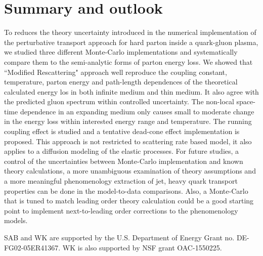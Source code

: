 \documentclass[aps, prc, reprint, amsmath, groupedaddress, nofootinbib]{revtex4-1}
\begin{document}
\section{Summary and outlook}\label{section:summary}
To reduces the theory uncertainty introduced in the numerical implementation of the perturbative transport approach for hard parton inside a quark-gluon plasma, we studied three different Monte-Carlo implementations and systematically compare them to the semi-analytic forms of parton energy loss.
We showed that ``Modified Rescattering" approach well reproduce the coupling constant, temperature, parton energy and path-length dependences of the theoretical calculated energy los in both infinite medium and thin medium.
It also agree with the predicted gluon spectrum within controlled uncertainty.
The non-local space-time dependence in an expanding medium only causes small to moderate change in the energy loss within interested energy range and temperature.
The running coupling effect is studied and a tentative dead-cone effect implementation is proposed.
This approach is not restricted to scattering rate based model, it also applies to a diffusion modeling of the elastic processes. 
For future studies, a control of the uncertainties between Monte-Carlo implementation and known theory calculations, a more unambiguous examination of theory assumptions and a more meaningful phenomenology extraction of jet, heavy quark transport properties can be done in the model-to-data comparisons.
Also, a Monte-Carlo that is tuned to match leading order theory calculation could be a good starting point to implement next-to-leading order corrections to the phenomenology models.


\begin{acknowledgments}
SAB and WK  are supported by the U.S. Department of Energy Grant no. DE-FG02-05ER41367. WK is also supported by NSF grant OAC-1550225.
\end{acknowledgments}

\begin{appendices}
\end{appendices}
 
\end{document}
